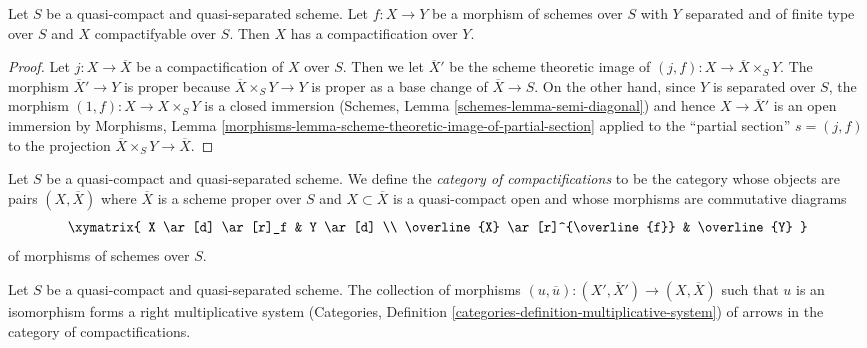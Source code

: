 \begin{lemma}
\label{lemma-compactifyable}
Let $S$ be a quasi-compact and quasi-separated scheme. Let $f : X \to Y$
be a morphism of schemes over $S$ with $Y$ separated and of finite type
over $S$ and $X$ compactifyable over $S$. Then $X$ has a compactification
over $Y$.
\end{lemma}

\begin{proof}
Let $j : X \to \overline{X}$ be a compactification of $X$ over $S$.
Then we let $\overline{X}'$ be
the scheme theoretic image of $(j, f) : X \to \overline{X} \times_S Y$.
The morphism $\overline{X}' \to Y$ is proper because
$\overline{X} \times_S Y \to Y$ is proper as a base change of
$\overline{X} \to S$. On the other hand, since $Y$ is separated
over $S$, the morphism $(1, f) : X \to X \times_S Y$ is a closed
immersion (Schemes, Lemma \ref{schemes-lemma-semi-diagonal})
and hence $X \to \overline{X}'$ is an open immersion by Morphisms, Lemma
\ref{morphisms-lemma-scheme-theoretic-image-of-partial-section} applied
to the ``partial section'' $s = (j, f)$ to the projection
$\overline{X} \times_S Y \to \overline{X}$.
\end{proof}

\noindent
Let $S$ be a quasi-compact and quasi-separated scheme.
We define the {\it category of compactifications} to be the category
whose objects are pairs $(X, \overline{X})$ where $\overline{X}$
is a scheme proper over $S$ and $X \subset \overline{X}$ is a
quasi-compact open and whose morphisms
are commutative diagrams
$$
\xymatrix{
X \ar[d] \ar[r]_f & Y \ar[d] \\
\overline{X} \ar[r]^{\overline{f}} & \overline{Y}
}
$$
of morphisms of schemes over $S$.

\begin{lemma}
\label{lemma-right-multiplicative-system}
Let $S$ be a quasi-compact and quasi-separated scheme.
The collection of morphisms
$(u, \overline{u}) : (X', \overline{X}') \to (X, \overline{X})$
such that $u$ is an isomorphism forms a right multiplicative system
(Categories, Definition \ref{categories-definition-multiplicative-system})
of arrows in the category of compactifications.
\end{lemma}

